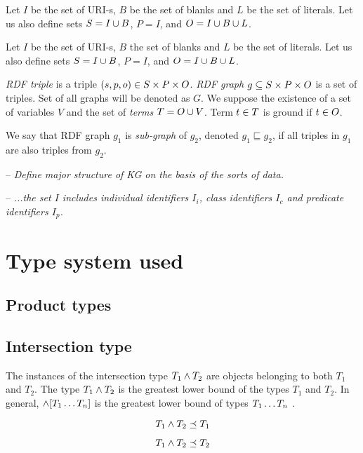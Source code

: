 \documentclass[runningheads]{llncs}
\newcommand{\notes}[1]{\noindent\begin{small}-- \emph{#1}\\\end{small}}
\begin{document}
Let $I$ be the set of URI-s, $B$ be the set of blanks and $L$ be the
set of literals. Let us also define sets $S = I\cup\/B$, $P = I$, and
$O = I\cup\/B\cup\/L$.

Let $I$ be the set of URI-s, $B$ the set of blanks and $L$ be the set
of literals. Let us also define sets $S = I\cup\/B$, $P = I$, and
$O = I\cup\/B\cup\/L$.

\emph{RDF triple} is a triple $(s,p,o)\in\/S\times\/P\times\/O$.
\emph{RDF graph} $g\subseteq\/S\times\/P\times\/O$ is a set of
triples. Set of all graphs will be denoted as $G$. We suppose the
existence of a set of variables $V$ and the set of \emph{terms}
$T = O\cup\/V$. Term $t\in\/T$ is ground if $t\in\/O$.

We say that RDF graph $g_1$ is \emph{sub-graph} of $g_2$, denoted
$g_1 \sqsubseteq g_2$, if all triples in $g_1$ are also triples from
$g_2$. 

\notes{Define major structure of KG on the basis of the sorts of data.}
\notes{...the set $I$ includes individual identifiers $I_i$, class identifiers $I_c$ and predicate identifiers $I_p$.}










\section{Type system used}

\subsection{Product types}

\subsection{Intersection type}

The instances of the intersection type $T_1\land\/T_2$ are objects
belonging to both $T_1$ and $T_2$. The type $T_1\land\/T_2$ is the
greatest lower bound of the types $T_1$ and $T_2$. In general,
$\land[T_1\ldots\/T_n]$ is the greatest lower bound of types
$T_1\ldots\/T_n$ \cite{Pierce91IntersectUnion,Pierce96IntersectionTypes}.

\begin{equation}
T_1\land\/T_2\preceq\/T_1    
\end{equation}

\begin{equation}
T_1\land\/T_2\preceq\/T_2  
\end{equation}
\end{document}
